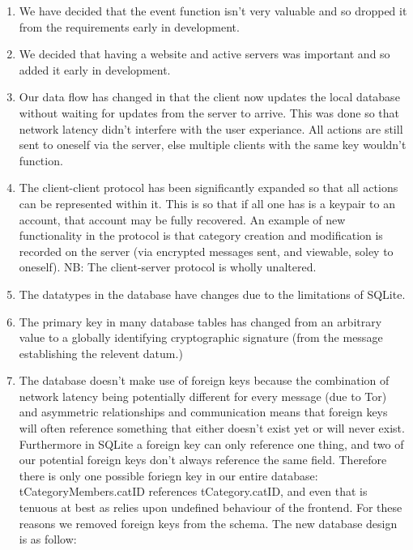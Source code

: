 \begin{enumerate}
\item We have decided that the event function isn't very valuable and so dropped it
from the requirements early in development.

\item We decided that having a website and active servers was important and so
added it early in development.

\item Our data flow has changed in that the client now updates the local
database without waiting for updates from the server to arrive. This was done so
that network latency didn't interfere with the user experiance. All actions are
still sent to oneself via the server, else multiple clients with the same key
wouldn't function.

\item The client-client protocol has been significantly expanded so that all
actions can be represented within it. This is so that if all one has is a
keypair to an account, that account may be fully recovered. An example of new
functionality in the protocol is that category creation and modification is
recorded on the server (via encrypted messages sent, and viewable, soley to
oneself). NB: The client-server protocol is wholly unaltered.

\item The datatypes in the database have changes due to the limitations of
SQLite.

\item The primary key in many database tables has changed from an arbitrary
value to a globally identifying cryptographic signature (from the message
establishing the relevent datum.)

\item The database doesn't make use of foreign keys because the combination of
network latency being potentially different for every message (due to Tor) and
asymmetric relationships and communication means that foreign keys will often
reference something that either doesn't exist yet or will never exist.
Furthermore in SQLite a foreign key can only reference one thing, and two of our
potential foreign keys don't always reference the same field. Therefore there is
only one possible foriegn key in our entire database: tCategoryMembers.catID
references tCategory.catID, and even that is tenuous at best as relies upon
undefined behaviour of the frontend. For these reasons we removed foreign keys
from the schema. The new database design is as follow:


\end{enumerate}

